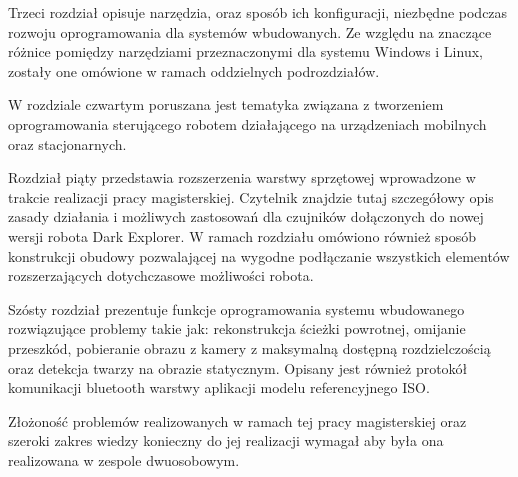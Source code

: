 Trzeci rozdział opisuje narzędzia, oraz sposób ich konfiguracji, niezbędne
podczas rozwoju oprogramowania dla systemów wbudowanych. Ze względu na znaczące
różnice pomiędzy narzędziami przeznaczonymi dla systemu Windows i Linux, zostały
one omówione w ramach oddzielnych podrozdziałów.

W rozdziale czwartym poruszana jest tematyka związana z tworzeniem oprogramowania
sterującego robotem działającego na urządzeniach mobilnych oraz stacjonarnych.

Rozdział piąty przedstawia rozszerzenia warstwy sprzętowej wprowadzone w trakcie
realizacji pracy magisterskiej. Czytelnik znajdzie tutaj szczegółowy opis zasady
działania i możliwych zastosowań dla czujników dołączonych do nowej wersji robota
Dark Explorer. W ramach rozdziału omówiono również sposób konstrukcji obudowy
pozwalającej na wygodne podłączanie wszystkich elementów rozszerzających
dotychczasowe możliwości robota.

Szósty rozdział prezentuje funkcje oprogramowania systemu wbudowanego
rozwiązujące problemy takie jak: rekonstrukcja ścieżki powrotnej, omijanie
przeszkód, pobieranie obrazu z kamery z maksymalną dostępną rozdzielczością oraz
detekcja twarzy na obrazie statycznym. Opisany jest również protokół komunikacji
bluetooth warstwy aplikacji modelu referencyjnego ISO.

Złożoność problemów realizowanych w ramach tej pracy magisterskiej oraz szeroki
zakres wiedzy konieczny do jej realizacji wymagał aby była ona realizowana w
zespole dwuosobowym.